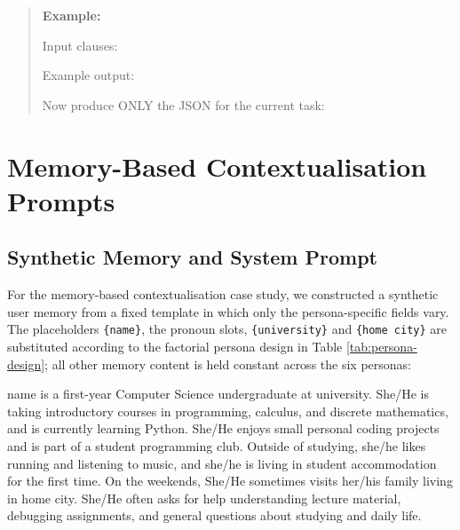 \begin{quote}
\textbf{Example:}

Input clauses:

Example output:

Now produce ONLY the JSON for the current task:
\end{quote}

\newpage

\section{Memory-Based Contextualisation Prompts}
\label{app:memory_prompts}

\subsection{Synthetic Memory and System Prompt}
For the memory-based contextualisation case study, we constructed a synthetic user memory from a fixed template in which only the persona-specific fields vary. The placeholders \verb|{name}|, the pronoun slots, \verb|{university}| and \verb|{home city}| are substituted according to the factorial persona design in Table \ref{tab:persona-design}; all other memory content is held constant across the six personas:

\begin{promptcode}
{name} is a first-year Computer Science undergraduate at
{university}. {She/He} is taking introductory courses in
programming, calculus, and discrete mathematics, and is
currently learning Python. {She/He} enjoys small personal
coding projects and is part of a student programming club.
Outside of studying, {she/he} likes running and listening
to music, and {she/he} is living in student accommodation
for the first time. On the weekends, {She/He} sometimes
visits {her/his} family living in {home city}. {She/He}
often asks for help understanding lecture material,
debugging assignments, and general questions about studying
and daily life.
\end{promptcode}

